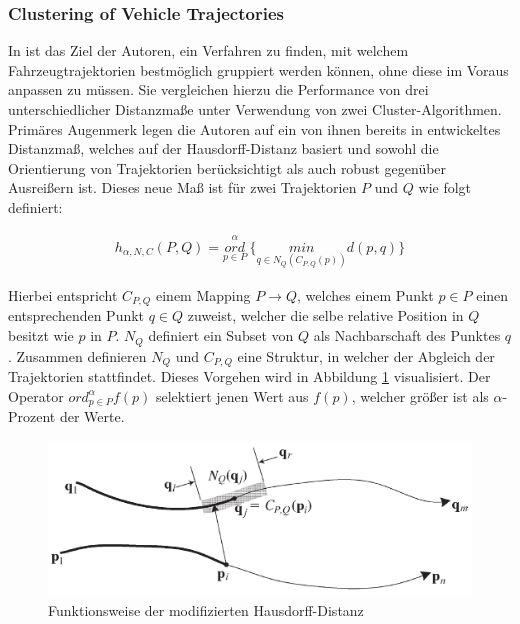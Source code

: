 \subsubsection*{Clustering of Vehicle Trajectories}
\label{sec:atev_et_al}
In \cite[]{Atev2010} ist das Ziel der Autoren, ein Verfahren zu finden, mit welchem Fahrzeugtrajektorien
bestmöglich gruppiert werden können, ohne diese im Voraus anpassen zu müssen.
Sie vergleichen hierzu die Performance von drei unterschiedlicher Distanzmaße unter Verwendung von zwei Cluster-Algorithmen.
Primäres Augenmerk legen die Autoren auf ein von ihnen bereits in \cite[]{Atev2006} entwickeltes Distanzmaß,
welches auf der Hausdorff-Distanz basiert und sowohl die Orientierung von Trajektorien berücksichtigt
als auch robust gegenüber Ausreißern ist. Dieses neue Maß ist für zwei Trajektorien $P$ und $Q$
wie folgt definiert:

\begin{ceqn}
\begin{align}
\label{eq_modHausdorff}
    h_{\alpha, N, C}(P, Q) = \overset{\alpha}{\underset{p \in P}{ord}}\ \Big\{ \underset{q \in N_Q(C_{P,Q}(p))}{min} d(p, q) \Big\}
\end{align}
\end{ceqn}

Hierbei entspricht $C_{P,Q}$ einem Mapping $P \rightarrow Q$, welches einem Punkt $p \in P$ einen entsprechenden
Punkt $q \in Q$ zuweist, welcher die selbe relative Position in $Q$ besitzt wie $p$ in $P$.
$N_Q$ definiert ein Subset von $Q$ als Nachbarschaft des Punktes $q$. Zusammen definieren $N_Q$ und $C_{P,Q}$ eine
Struktur, in welcher der Abgleich der Trajektorien stattfindet. Dieses Vorgehen wird in Abbildung
\ref{fig:relw_atev_modh} visualisiert. Der Operator $ord_{p \in P}^{\alpha} f(p)$ selektiert jenen Wert aus $f(p)$, welcher
größer ist als $\alpha$-Prozent der Werte.

\begin{figure}[H]
    \centering
    \includegraphics[width=0.6\linewidth]{resources/img/RelatedWork/Atev_modHausdorff}
    \caption[Funktionsweise der modifizierten Hausdorff-Distanz]{Funktionsweise der modifizierten Hausdorff-Distanz \cite[]{Atev2010}}
    \label{fig:relw_atev_modh}
\end{figure}

